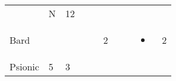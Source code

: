 \documentclass[12pt]{article}
\begin{document}
\begin{longtable}[]{@{}llllllllll@{}}
\begin{minipage}[t]{0.06\columnwidth}
\strut\end{minipage} &
\begin{minipage}[t]{0.07\columnwidth}\raggedright\strut
N
\strut\end{minipage} &
\begin{minipage}[t]{0.08\columnwidth}\raggedright\strut
12
\strut\end{minipage}\tabularnewline
\begin{minipage}[t]{0.13\columnwidth}\raggedright\strut
Bard
\strut\end{minipage} &
\begin{minipage}[t]{0.06\columnwidth}\raggedright\strut
\strut\end{minipage} &
\begin{minipage}[t]{0.06\columnwidth}\raggedright\strut
\strut\end{minipage} &
\begin{minipage}[t]{0.06\columnwidth}\raggedright\strut
\strut\end{minipage} &
\begin{minipage}[t]{0.06\columnwidth}\raggedright\strut
\strut\end{minipage} &
\begin{minipage}[t]{0.06\columnwidth}\raggedright\strut
2
\strut\end{minipage} &
\begin{minipage}[t]{0.06\columnwidth}\raggedright\strut
\strut\end{minipage} &
\begin{minipage}[t]{0.06\columnwidth}\raggedright\strut
\strut\end{minipage} &
\begin{minipage}[t]{0.07\columnwidth}\raggedright\strut
\begin{itemize}
\item
\end{itemize}
\strut\end{minipage} &
\begin{minipage}[t]{0.08\columnwidth}\raggedright\strut
2
\strut\end{minipage}\tabularnewline
\begin{minipage}[t]{0.13\columnwidth}\raggedright\strut
Psionic
\strut\end{minipage} &
\begin{minipage}[t]{0.06\columnwidth}\raggedright\strut
5
\strut\end{minipage} &
\begin{minipage}[t]{0.06\columnwidth}\raggedright\strut
3
\strut\end{minipage} &

\end{longtable}
\end{document}
